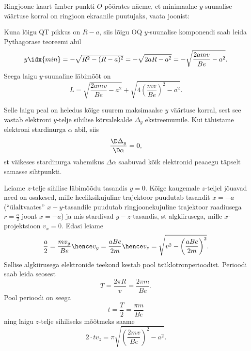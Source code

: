 \documentclass[11pt]{article}
\begin{document}
{{Ringjoone kaart ümber punkti $O$ pöörates näeme, et minimaalne $y$-suunalise väärtuse korral on ringjoon ekraanile puutujaks, vaata joonist:
\begin{center}
\end{center}
Kuna lõigu QT pikkus on $R-a$, siis lõigu OQ $y$-suunalise komponendi saab leida Pythagorase teoreemi abil
$$y\idx{min}=-\sqrt{R^2-(R-a)^2} = -\sqrt{2aR-a^2}=-\sqrt{\frac{2amv}{Be}-a^2}.$$
Seega laigu $y$-suunaline läbimõõt on
$$L=\sqrt{\frac{2amv}{Be}-a^2} + \sqrt{4\left(\frac{mv}{Be}\right)^2-a^2}.$$

Selle laigu peal on heledus kõige suurem maksimaalse $y$ väärtuse korral, sest see vastab elektroni $y$-telje sihilise kõrvalekalde $\Delta_y$ ekstreemumile. 
Kui tähistame elektroni stardinurga $\alpha$ abil, siis 
$$\frac{\D \Delta_y}{\D \alpha}=0,$$
st väikeses stardinurga vahemikus $\Delta\alpha$ saabuvad kõik elektronid peaaegu täpselt samasse sihtpunkti.

Leiame $z$-telje sihilise läbimõõdu tasandis $y=0$. Kõige kaugemale $z$-teljel jõuavad need on osakesed, mille 
heeliksikujuline trajektoor puudutab tasandit $x=-a$ (``ülaltvaates'' $x-y$-tasandile puudutab ringjoonekujuline trajektoor raadiusega $r=\frac a2$ 
joont $x=-a$) ja mis stardivad $y-z$-tasandis, st algkiirusega, mille $x$-projektsioon $v_x=0$.
Edasi leiame $$\frac a2=\frac {mv_y}{Be}\hence v_y=\frac{aBe}{2m}\hence v_z=\sqrt{v^2-\left(\frac{aBe}{2m}\right)^2}.$$
Sellise algkiirusega elektronide teekond kestab pool tsüklotronperioodist. Perioodi saab leida seosest
\[
T=\frac{2\pi R}{v} = \frac{2\pi m}{Be}.
\]
Pool perioodi on seega
\[
t=\frac{T}{2}=\frac{\pi m}{Be}
\]
ning laigu $z$-telje sihiliseks 
mõõtmeks saame
$$2\cdot tv_z=\pi\sqrt{\left(\frac{2mv}{Be}\right)^2-a^2}.$$
\fi
}

}
\end{document}

